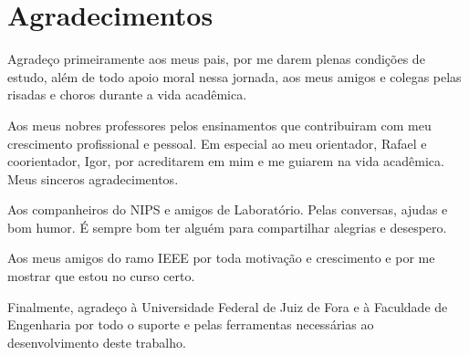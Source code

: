 %
%

\chapter*{Agradecimentos}
\vspace{-1.5cm}

Agradeço primeiramente aos meus pais, por me darem plenas condições de estudo, além de todo apoio moral nessa jornada, aos meus amigos e colegas pelas risadas e choros durante a vida acadêmica. 

Aos meus nobres professores pelos ensinamentos que contribuiram com meu crescimento profissional e pessoal. Em especial ao meu orientador, Rafael e coorientador, Igor, por acreditarem em mim e me guiarem na vida acadêmica. Meus sinceros agradecimentos. %

Aos companheiros do NIPS e amigos de Laboratório. Pelas conversas, ajudas e bom humor. É sempre bom ter alguém para compartilhar alegrias e desespero.

Aos meus amigos do ramo IEEE por toda motivação e crescimento e por me mostrar que estou no curso certo.

Finalmente, agradeço à Universidade Federal de Juiz de Fora e à Faculdade de Engenharia por todo o suporte e pelas ferramentas necessárias ao desenvolvimento deste trabalho.